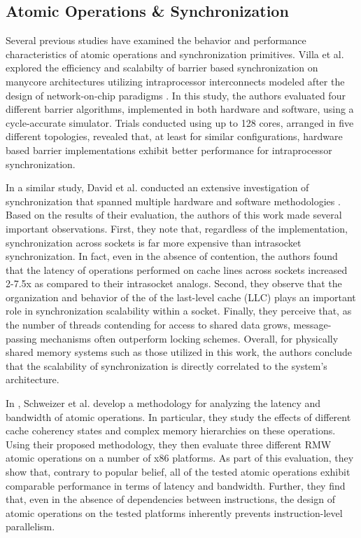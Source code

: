 
\subsection{Atomic Operations \& Synchronization}
\label{subsec:amos_sync}

Several previous studies have examined the behavior and performance characteristics of atomic operations and synchronization primitives.
Villa et al. explored the efficiency and scalabilty of barrier based synchronization on manycore architectures utilizing intraprocessor interconnects modeled after the design of network-on-chip paradigms \cite{villa2008barriers}.
In this study, the authors evaluated four different barrier algorithms, implemented in both hardware and software, using a cycle-accurate simulator.
Trials conducted using up to 128 cores, arranged in five different topologies, revealed that, at least for similar configurations, hardware based barrier implementations exhibit better performance for intraprocessor synchronization.

In a similar study, David et al. conducted an extensive investigation of synchronization that spanned multiple hardware and software methodologies \cite{david2013sync}.
Based on the results of their evaluation, the authors of this work made several important observations.
First, they note that, regardless of the implementation, synchronization across sockets is far more expensive than intrasocket synchronization.
In fact, even in the absence of contention, the authors found that the latency of operations performed on cache lines across sockets increased 2-7.5x as compared to their intrasocket analogs.
Second, they observe that the organization and behavior of the of the last-level cache (LLC) plays an important role in synchronization scalability within a socket.
Finally, they perceive that, as the number of threads contending for access to shared data grows, message-passing mechanisms often outperform locking schemes.
Overall, for physically shared memory systems such as those utilized in this work, the authors conclude that the scalability of synchronization is directly correlated to the system's architecture.

In \cite{schweizer2015evaluating}, Schweizer et al. develop a methodology for analyzing the latency and bandwidth of atomic operations.
In particular, they study the effects of different cache coherency states and complex memory hierarchies on these operations.
Using their proposed methodology, they then evaluate three different RMW atomic operations on a number of x86 platforms.
As part of this evaluation, they show that, contrary to popular belief, all of the tested atomic operations exhibit comparable performance in terms of latency and bandwidth.
Further, they find that, even in the absence of dependencies between instructions, the design of atomic operations on the tested platforms inherently prevents instruction-level parallelism.

